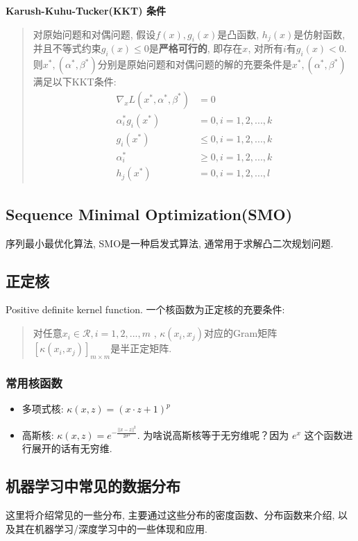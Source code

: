 \textbf{Karush-Kuhu-Tucker(KKT) 条件}\label{kkt}
\begin{quotation}
	对原始问题和对偶问题, 假设$f(x), g_i(x)$是凸函数, $h_j(x)$是仿射函数, 并且不等式约束$g_i(x) \leq 0$是\textbf{严格可行的}, 即存在$x$, 对所有$i$有$g_i(x) < 0$. 则$x^*, (\alpha^*, \beta^*)$分别是原始问题和对偶问题的解的充要条件是$x^*, (\alpha^*, \beta^*)$满足以下KKT条件: 
	\begin{align}\nonumber
		\nabla_x L(x^*, \alpha^*, \beta^*) &= 0 \nonumber \\
		\alpha_i^* g_i(x^*) &= 0, i = 1, 2, ..., k \nonumber \\
		g_i(x^*) &\leq 0, i = 1, 2, ..., k \nonumber \\
		\alpha_i^* &\geq 0, i = 1, 2, ..., k \nonumber \\ 
		h_j(x^*) &= 0, i = 1, 2, ..., l \nonumber 
	\end{align}
	
\end{quotation}

\subsection{Sequence Minimal Optimization(SMO)}\label{smo}
序列最小最优化算法, SMO是一种启发式算法, 通常用于求解凸二次规划问题. 

\subsection{正定核}\label{pdkf}
Positive definite kernel function. 一个核函数为正定核的充要条件: 
\begin{quotation}
	对任意$x_i \in \mathcal{R}, i = 1, 2, ..., m$ , $\kappa(x_i, x_j)$对应的Gram矩阵 $[\kappa(x_i, x_j)]_{m \times m}$是半正定矩阵. 
\end{quotation}

\subsubsection{常用核函数}
\begin{itemize}
	\item 多项式核: $\kappa(x, z) = (x \cdot z + 1)^p$
	\item 高斯核: $\kappa(x, z) = e^{- \frac{||x - z||^2}{2 \sigma^2}}$. 为啥说高斯核等于无穷维呢？因为 $e^x$ 这个函数进行展开的话有无穷维. 
\end{itemize}


\subsection{机器学习中常见的数据分布}
这里将介绍常见的一些分布, 主要通过这些分布的密度函数、分布函数来介绍, 以及其在机器学习/深度学习中的一些体现和应用. 
